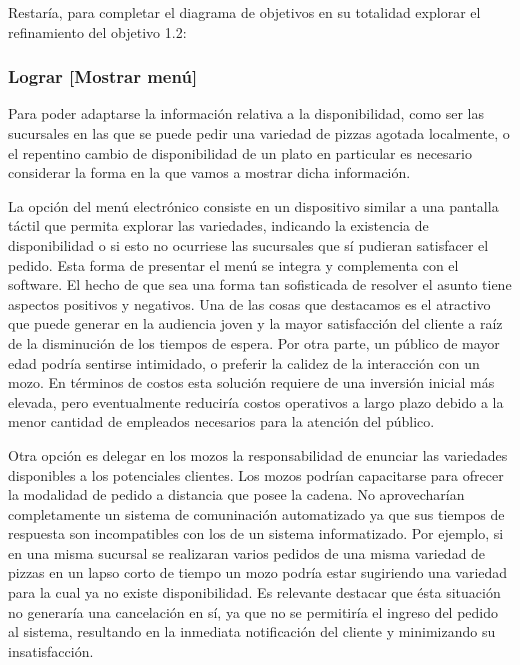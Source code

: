 \documentclass[a4paper,10pt]{article}
\begin{document}
\begin{figure}[H]
\centering
{}
\caption{}
\end{figure}

Restaría, para completar el diagrama de objetivos en su totalidad explorar el refinamiento del objetivo 1.2:
\subsubsection*{Lograr [Mostrar menú]}
Para poder adaptarse la información relativa a la disponibilidad, como ser las sucursales en las que se puede pedir una variedad de pizzas agotada localmente, o el repentino cambio de disponibilidad de un plato en particular es necesario considerar la forma en la que vamos a mostrar dicha información.

\begin{figure}[H]
\centering
{}
\caption{}
\end{figure}

La opción del menú electrónico consiste en un dispositivo similar a una pantalla táctil que permita explorar las variedades, indicando la existencia de disponibilidad o si esto no ocurriese las sucursales que sí pudieran satisfacer el pedido. Esta forma de presentar el menú se integra y complementa con el software. El hecho de que sea una forma tan sofisticada de resolver el asunto tiene aspectos positivos y negativos. Una de las cosas que destacamos es el atractivo que puede generar en la audiencia joven y la mayor satisfacción del cliente a raíz de la disminución de los tiempos de espera. 
Por otra parte, un público de mayor edad podría sentirse intimidado, o preferir la calidez de la interacción con un mozo. En términos de costos esta solución requiere de una inversión inicial más elevada, pero eventualmente reduciría costos operativos a largo plazo debido a la menor cantidad de empleados necesarios para la atención del público. 

Otra opción es delegar en los mozos la responsabilidad de enunciar las variedades disponibles a los potenciales clientes.
Los mozos podrían capacitarse para ofrecer la modalidad de pedido a distancia que posee la cadena. No aprovecharían completamente un sistema de comuninación automatizado ya que sus tiempos de respuesta son incompatibles con los de un sistema informatizado. Por ejemplo, si en una misma sucursal se realizaran varios pedidos de una misma variedad de pizzas en un lapso corto de tiempo un mozo podría estar sugiriendo una variedad para la cual ya no existe disponibilidad. Es relevante destacar que ésta situación no generaría una cancelación en sí, ya que no se permitiría el ingreso del pedido al sistema, resultando en la inmediata notificación del cliente y minimizando su insatisfacción.
\end{document}
